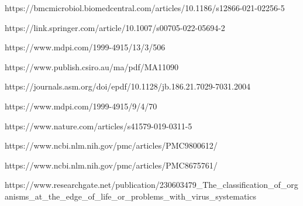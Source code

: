https://bmcmicrobiol.biomedcentral.com/articles/10.1186/s12866-021-02256-5

https://link.springer.com/article/10.1007/s00705-022-05694-2

https://www.mdpi.com/1999-4915/13/3/506

https://www.publish.csiro.au/ma/pdf/MA11090

https://journals.asm.org/doi/epdf/10.1128/jb.186.21.7029-7031.2004

https://www.mdpi.com/1999-4915/9/4/70

https://www.nature.com/articles/s41579-019-0311-5

https://www.ncbi.nlm.nih.gov/pmc/articles/PMC9800612/

https://www.ncbi.nlm.nih.gov/pmc/articles/PMC8675761/

https://www.researchgate.net/publication/230603479_The_classification_of_organisms_at_the_edge_of_life_or_problems_with_virus_systematics
